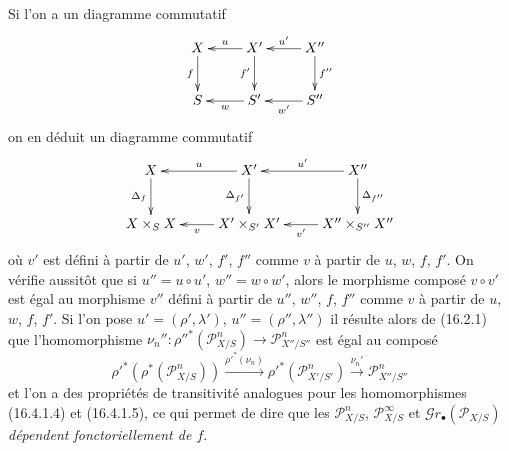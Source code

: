 \begin{env}[16.4.2]
\label{IV.16.4.2}
Si l'on a un diagramme commutatif
\[
  \xymatrix{
    X \ar[d]_-{f} & X' \ar[l]_-u \ar[d]_-{f'} &
      X'' \ar[l]_-{u'} \ar[d]^-{f''} \\
    S & S' \ar[l]^-w & S'' \ar[l]^-{w'}
  }
\]
on en déduit un diagramme commutatif
\[
  \xymatrix{
    X \ar[d]_-{\Delta_f} & X' \ar[l]_-u \ar[d]_-{\Delta_{f'}} &
      X'' \ar[l]_-{u'} \ar[d]^-{\Delta_{f''}} \\
    X\times_S X & X'\times_{S'}X' \ar[l]^-v &
      X''\times_{S''}X'' \ar[l]^-{v'}
  }
\]
où $v'$ est défini à partir de $u'$, $w'$, $f'$, $f''$ comme $v$ à partir de
$u$, $w$, $f$, $f'$. On vérifie aussitôt que si $u''=u\circ u'$,
$w''=w\circ w'$, alors le morphisme composé $v\circ v'$ est égal au morphisme
$v''$ défini à partir de $u''$, $w''$, $f$, $f''$ comme $v$ à partir de $u$,
$w$, $f$, $f'$. Si l'on pose $u'=(\rho',\lambda')$,
$u''=(\rho'',\lambda'')$ il résulte alors de (16.2.1) que l'homomorphisme
$\nu_n'':\rho''^*(\mathscr{P}_{X/S}^n)\to\mathscr{P}_{X''/S''}^n$ est égal au
composé
\[
  \rho'^*(\rho^*(\mathscr{P}_{X/S}^n))
  \xrightarrow{\rho'^*(\nu_n)}
  \rho'^*(\mathscr{P}_{X'/S'}^n)
  \xrightarrow{\nu_n'}\mathscr{P}_{X''/S''}^n
\]
et l'on a des propriétés de transitivité analogues pour les homomorphismes
(16.4.1.4) et (16.4.1.5), ce qui permet de dire que les
$\mathscr{P}_{X/S}^n$, $\mathscr{P}_{X/S}^\infty$ et
$\mathscr{G}r_\bullet(\mathscr{P}_{X/S})$ \emph{dépendent fonctoriellement de $f$}.
\end{env}

